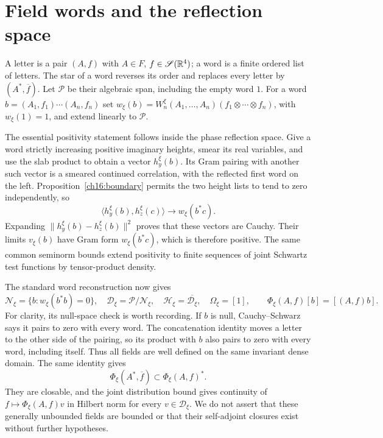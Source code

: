 \section{Field words and the reflection space}
\label{ch16:fields-section}

A letter is a pair $(A,f)$ with $A\in F$, $f\in\mathscr S(\mathbb R^4)$; a word is a finite ordered list of letters.
The star of a word reverses its order and replaces every letter by
$(A^*,\overline f)$. Let $\mathcal P$ be their algebraic span, including
the empty word $1$. For a word $b=(A_1,f_1)\cdots(A_n,f_n)$ set
$w_\xi(b)=W_n^\xi(A_1,\ldots,A_n)(f_1\otimes\cdots\otimes f_n)$,
with $w_\xi(1)=1$, and extend linearly to $\mathcal P$.

The essential positivity statement follows inside the phase reflection
space. Give a word strictly increasing positive imaginary heights,
smear its real variables, and use the slab product to obtain a vector
$h_y^\xi(b)$. Its Gram pairing with another such vector is a smeared
continued correlation, with the reflected first word on the left.
Proposition~\ref{ch16:boundary} permits the two height lists to tend to
zero independently, so
\[
 \langle h_y^\xi(b),h_z^\xi(c)\rangle
                      \longrightarrow w_\xi(b^*c).
\]
Expanding $\|h_y^\xi(b)-h_z^\xi(b)\|^2$ proves that these vectors are
Cauchy. Their limits $v_\xi(b)$ have Gram form $w_\xi(b^*c)$, which is
therefore positive. The same common seminorm bounds extend positivity
to finite sequences of joint Schwartz test functions by tensor-product density.

The standard word reconstruction \cite{Wightman1956} now gives
\[
 \mathcal N_\xi=\{b:w_\xi(b^*b)=0\},\quad
 \mathcal D_\xi=\mathcal P/\mathcal N_\xi,\quad
 \mathcal H_\xi=\overline{\mathcal D_\xi},\quad\Omega_\xi=[1],
 \qquad \Phi_\xi(A,f)[b]=[(A,f)b].
\]
For clarity, its null-space check is worth recording. If $b$ is null,
Cauchy--Schwarz says it pairs to zero with every word. The concatenation
identity moves a letter to the other side of the pairing, so its product
with $b$ also pairs to zero with every word, including itself. Thus all
fields are well defined on the same invariant dense domain. The same
identity gives
\[
 \Phi_\xi(A^*,\overline f)\subset\Phi_\xi(A,f)^*.
\]
They are closable, and the joint distribution bound gives continuity of
$f\mapsto\Phi_\xi(A,f)v$ in Hilbert norm for every $v\in\mathcal D_\xi$.
We do not assert that these generally unbounded fields are bounded or
that their self-adjoint closures exist without further hypotheses.

